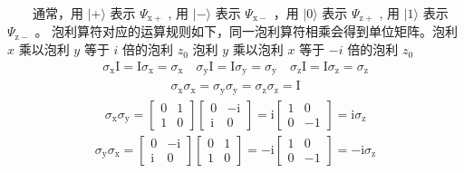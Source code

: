 \documentclass[a4paper,11pt,english]{sphinxmanual}
\begin{document}
\sphinxAtStartPar
  通常，用  \(|+\rangle\)  表示  \(\Psi_{\mathrm{x}+}\) , 用  \(|-\rangle\) 表示  \(\Psi_{\mathrm{x}-}\) ，用  \(|0\rangle\) 表示  \(\Psi_{\mathrm{z}+}\) , 用  \(|1\rangle\) 表示  \(\Psi_{\mathrm{z}-}\) 。 泡利算符对应的运算规则如下，同一泡利算符相乘会得到单位矩阵。泡利 \(x\) 乘以泡利 \(y\) 等于  \(i\) 倍的泡利  \(z_{0}\) 泡利  \(y\) 乘以泡利  \(x\) 等于  \(-i\) 倍的泡利  \(z_{0}\)
\begin{equation*}
\begin{split}\sigma_{\mathrm{x}} \mathrm{I}=\mathrm{I} \sigma_{\mathrm{x}}=\sigma_{\mathrm{x}} \quad \sigma_{\mathrm{y}} \mathrm{I}=\mathrm{I} \sigma_{\mathrm{y}}=\sigma_{\mathrm{y}} \quad \sigma_{\mathrm{z}} \mathrm{I}=\mathrm{I} \sigma_{\mathrm{z}}=\sigma_{\mathrm{z}}\end{split}
\end{equation*}\begin{equation*}
\begin{split}\sigma_{\mathrm{x}} \sigma_{\mathrm{x}}=\sigma_{\mathrm{y}} \sigma_{\mathrm{y}}=\sigma_{\mathrm{z}} \sigma_{\mathrm{z}}=\mathrm{I}\end{split}
\end{equation*}\begin{equation*}
\begin{split}\sigma_{\mathrm{x}} \sigma_{\mathrm{y}}=\left[\begin{array}{ll} 0 & 1 \\ 1 & 0 \end{array}\right]\left[\begin{array}{cc} 0 & -\mathrm{i} \\ \mathrm{i} & 0 \end{array}\right]=\mathrm{i}\left[\begin{array}{cc} 1 & 0 \\ 0 & -1 \end{array}\right]=\mathrm{i} \sigma_{\mathrm{z}}\end{split}
\end{equation*}\begin{equation*}
\begin{split}\sigma_{\mathrm{y}} \sigma_{\mathrm{x}}=\left[\begin{array}{cc} 0 & -\mathrm{i} \\ \mathrm{i} & 0 \end{array}\right]\left[\begin{array}{ll} 0 & 1 \\ 1 & 0 \end{array}\right]=-\mathrm{i}\left[\begin{array}{cc} 1 & 0 \\ 0 & -1 \end{array}\right]=-\mathrm{i} \sigma_{\mathrm{z}}\end{split}
\end{equation*}
\end{document}
